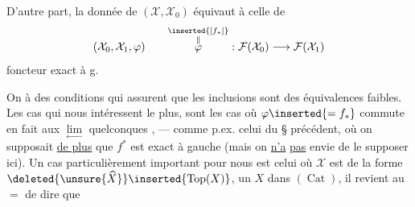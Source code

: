 D'autre part, la donnée de $(\mathcal X,\mathcal X_0)$ équivaut à celle de
\[
(\mathcal X_0,\mathcal X_1,\varphi)\qquad
\overset{\substack{\inserted{[f_*]}\\\Vert}}{\varphi}:\mathcal F(\mathcal X_0)\longrightarrow\mathcal F(\mathcal X_1)
\]
foncteur exact à g. 

On  à des conditions  qui assurent que les  inclusions
sont des équivalences faibles. Les cas qui nous intéressent le plus, sont les cas où $\varphi\inserted{=f_*}$ commute en fait aux $\underset{\leftarrow}{\lim}$ quelconques , --- comme p.ex. celui du § précédent, où on supposait \uline{de plus} que $f^*$ est exact à gauche (mais on \uline{n'a} \uline{pas} envie de le supposer ici). Un cas particulièrement important pour nous est celui où $\mathcal X$ est de la forme $\deleted{\unsure{\widehat X}}\inserted{\operatorname{Top}(X)}$, un $X$ dans $(\operatorname{Cat})$, il revient au $=$ de dire que
